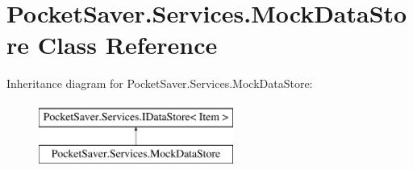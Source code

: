\hypertarget{class_pocket_saver_1_1_services_1_1_mock_data_store}{}\section{Pocket\+Saver.\+Services.\+Mock\+Data\+Store Class Reference}
\label{class_pocket_saver_1_1_services_1_1_mock_data_store}
Inheritance diagram for Pocket\+Saver.\+Services.\+Mock\+Data\+Store\+:\begin{figure}[H]
\begin{center}
\leavevmode
\includegraphics[height=2.000000cm]{class_pocket_saver_1_1_services_1_1_mock_data_store}
\end{center}
\end{figure}
